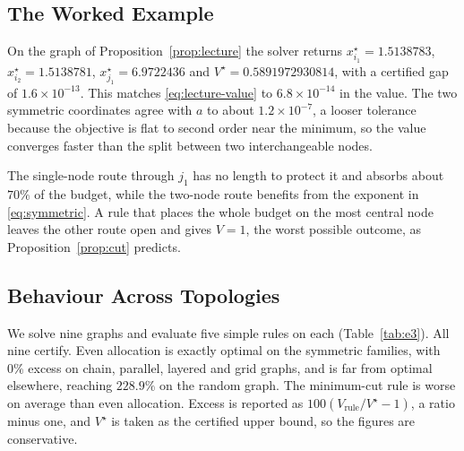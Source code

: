 \documentclass[10pt,a4paper,twoside]{article}
\theoremstyle{plain}
\theoremstyle{definition}
\begin{document}
\subsection{The Worked Example}
\label{sec:results-worked}

On the graph of Proposition~\ref{prop:lecture} the solver returns
$x^{\star}_{i_1}=1.5138783$, $x^{\star}_{i_2}=1.5138781$,
$x^{\star}_{j_1}=6.9722436$ and $V^{\star}=0.5891972930814$, with a certified
gap of $1.6\times10^{-13}$. This matches \eqref{eq:lecture-value} to
$6.8\times10^{-14}$ in the value. The two symmetric coordinates agree with
$a$ to about $1.2\times10^{-7}$, a looser tolerance because the objective is
flat to second order near the minimum, so the value converges faster than the
split between two interchangeable nodes.

The single-node route through $j_1$ has no length to protect it and absorbs
about $70\%$ of the budget, while the two-node route benefits from the
exponent in \eqref{eq:symmetric}. A rule that places the whole budget on the
most central node leaves the other route open and gives $V=1$, the worst
possible outcome, as Proposition~\ref{prop:cut} predicts.

\subsection{Behaviour Across Topologies}
\label{sec:results-topologies}

We solve nine graphs and evaluate five simple rules on each
(Table~\ref{tab:e3}). All nine certify. Even allocation is exactly optimal on
the symmetric families, with $0\%$ excess on chain, parallel, layered and
grid graphs, and is far from optimal elsewhere, reaching $228.9\%$ on the
random graph. The minimum-cut rule is worse on average than even allocation.
Excess is reported as $100(V_{\mathrm{rule}}/V^{\star}-1)$, a ratio minus
one, and $V^{\star}$ is taken as the certified upper bound, so the figures
are conservative.
\end{document}
